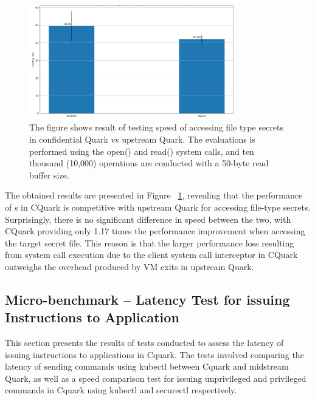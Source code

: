 \begin{figure}[H]
    \centering
    \includegraphics[width=0.8\textwidth]{images/reading_speed_of_file_type_secrets_in_Baseline_and_Cquark.PNG}
    \caption[Benchmark result of testing Speed of accessing file type Secrets in confidential Quark vs upstream quark]{The figure shows result of testing speed of accessing file type secrets in confidential Quark vs upstream Quark. 
    The evaluations is performed using the open() and read() system calls, and ten thousand (10,000) operations are conducted with a 50-byte read buffer size.
    }
    \label{fig:reading_speed_of_file_type_secrets_in_Baseline_and_Cquark}
\end{figure}


The obtained results are presented in Figure ~\ref{fig:reading_speed_of_file_type_secrets_in_Baseline_and_Cquark}, revealing that the performance of s in CQuark is competitive with upstream Quark for accessing file-type secrets. Surprisingly, there is no significant difference in speed between the two, with CQuark providing only 1.17 times the performance improvement when accessing the target secret file.  This reason is that the larger performance loss resulting from system call execution due to the client system call interceptor in CQuark outweighs the overhead produced by VM exits in upstream Quark.


\subsection{Micro-benchmark – Latency Test for issuing Instructions to Application}

This section presents the results of tests conducted to assess the latency of issuing instructions to applications in Cquark. The tests involved comparing the latency of sending commands using kubectl between Cquark and midstream Quark, as well as a speed comparison test for issuing unprivileged 
and privileged commands in Cquark using kubectl and securectl respectively.


